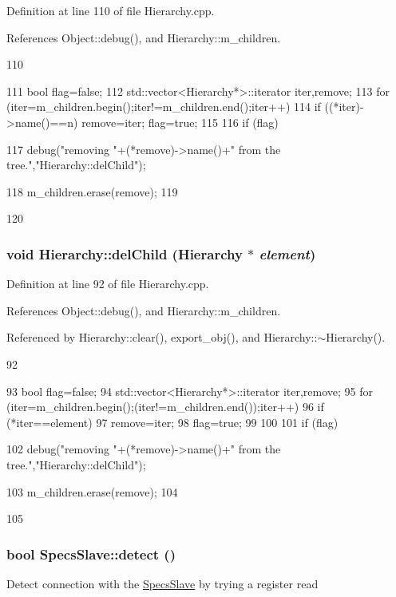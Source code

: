 Definition at line 110 of file Hierarchy.cpp.

References Object::debug(), and Hierarchy::m\_\-children.


\begin{DoxyCode}
110                                    {
111   bool flag=false;
112   std::vector<Hierarchy*>::iterator iter,remove;
113   for (iter=m_children.begin();iter!=m_children.end();iter++){
114     if ((*iter)->name()==n){ remove=iter; flag=true;}
115   }
116   if (flag){
117     debug("removing "+(*remove)->name()+" from the tree.","Hierarchy::delChild");
      
118     m_children.erase(remove);
119   }
120 }
\end{DoxyCode}
\hypertarget{classHierarchy_a2b2b359fac003233f65786a616766bde}{
\subsubsection[{delChild}]{\setlength{\rightskip}{0pt plus 5cm}void Hierarchy::delChild ({\bf Hierarchy} $\ast$ {\em element})}}
\label{classHierarchy_a2b2b359fac003233f65786a616766bde}


Definition at line 92 of file Hierarchy.cpp.

References Object::debug(), and Hierarchy::m\_\-children.

Referenced by Hierarchy::clear(), export\_\-obj(), and Hierarchy::$\sim$Hierarchy().


\begin{DoxyCode}
92                                           {
93   bool flag=false;
94   std::vector<Hierarchy*>::iterator iter,remove;
95   for (iter=m_children.begin();(iter!=m_children.end());iter++){
96     if (*iter==element){
97       remove=iter;
98       flag=true;
99     }
100   }
101   if (flag){
102     debug("removing "+(*remove)->name()+" from the tree.","Hierarchy::delChild");
      
103     m_children.erase(remove);
104   }
105 }
\end{DoxyCode}
\hypertarget{classSpecsSlave_aa1411ca849bda04215518b08535185e2}{
\subsubsection[{detect}]{\setlength{\rightskip}{0pt plus 5cm}bool SpecsSlave::detect ()}}
\label{classSpecsSlave_aa1411ca849bda04215518b08535185e2}
Detect connection with the \hyperlink{classSpecsSlave}{SpecsSlave} by trying a register read

